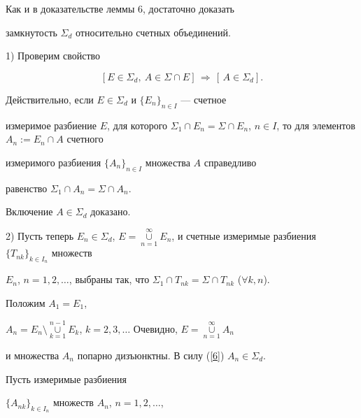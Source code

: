 \begin{pf} Как и в доказательстве леммы 6, достаточно доказать


замкнутость $\Sigma_d$ относительно счетных объединений.





1) Проверим свойство


\begin{equation}


\label{6}


[E\in\Sigma_d,\ A\in\Sigma\cap E]\,\Rightarrow\,[\,


A\in\Sigma_d].


\end{equation}





Действительно, если $E\in\Sigma_d$ и $\{E_n\}_{n\in I}$ --- счетное


измеримое разбиение $E$, для которого $\Sigma_1\cap E_n=\Sigma\cap


E_n$, $n\in I$, то для элементов $A_n:= E_n\cap A$ счетного


измеримого разбиения $\{A_n\}_{n\in I}$ множества $A$ справедливо


равенство $\Sigma_1\cap A_n=\Sigma\cap A_n$.


Включение $A\in\Sigma_d$ доказано.





2) Пусть теперь $E_n\in\Sigma_d$, $E=\mathop{\cup}\limits_{n=1}^\infty


E_n$, и счетные измеримые разбиения $\{T_{nk}\}_{k\in I_n}$ множеств


$E_n$, $n=1,2,\dotsc$, выбраны так, что $\Sigma_1\cap T_{nk}=\Sigma\cap


T_{nk}$ ($\forall k,n$).





Положим $A_1=E_1$,


$A_n=E_n\setminus\mathop{\mathop{\cup}\limits}\limits_{k=1}^{n-1}


E_k$, $k=2,3,\dotsc$ Очевидно, $E=\mathop{\cup}\limits_{n=1}^\infty A_n$


и множества $A_n$ попарно дизъюнктны. В силу (\ref{6})\; $A_n\in\Sigma_d$.





Пусть измеримые разбиения


$\{A_{nk}\}_{k\in I_n}$ множеств $A_n$, $n=1,2,\dotsc$,



\end{pf}
